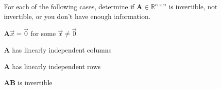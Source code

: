 
For each of the following cases, determine if $\textbf{A}\in\mathbb{R}^{n\times n}$ is invertible, not invertible, or you don't have enough information.
\begin{enumerate}
\qitem\label{ques:nontrivialNullspace}{
	$\textbf{A}\vec{x} = \vec{0}$ for some $\vec{x} \neq \vec{0}$
}
\sol{}

\qitem\label{ques:linIndepCols}{
	$\textbf{A}$ has linearly independent columns
}
\sol{}

\qitem\label{ques:linIndepRows}{
	$\textbf{A}$ has linearly independent rows
}
\sol{}

\qitem\label{ques:matMul}{
	$\textbf{AB}$ is invertible
}
\sol{}
\end{enumerate}